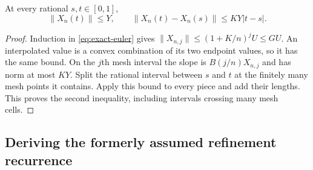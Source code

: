 \begin{lemma}\label{lem:ode-polybound}
At every rational $s,t\in[0,1]$,
\[
 \lVert X_n(t)\rVert\le Y,\qquad
 \lVert X_n(t)-X_n(s)\rVert\le KY|t-s|.
\]
\end{lemma}
\begin{proof}
Induction in \eqref{eq:exact-euler} gives
$\lVert X_{n,j}\rVert\le(1+K/n)^jU\le GU$.
An interpolated value is a convex combination of its two endpoint values,
so it has the same bound. On the $j$th mesh interval the slope is
$B(j/n)X_{n,j}$ and has norm at most $KY$. Split the rational interval
between $s$ and $t$ at the finitely many mesh points it contains. Apply
this bound to every piece and add their lengths. This proves the second
inequality, including intervals crossing many mesh cells.
\end{proof}

\subsection{Deriving the formerly assumed refinement recurrence}

